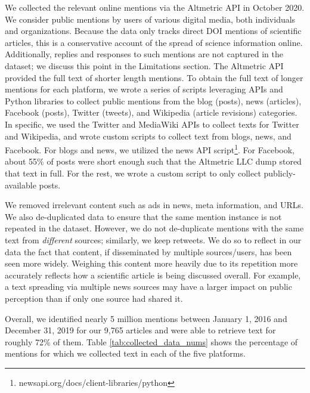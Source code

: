 \documentclass[letterpaper]{article} %
\begin{document}
We collected the relevant online mentions via the Altmetric API in October 2020. We consider public mentions by users of various digital media, both individuals and organizations. Because the data only tracks direct DOI mentions of scientific articles, this is a conservative account of the spread of science information online. Additionally, replies and responses to such mentions are not captured in the dataset; we discuss this point in the Limitations section.
The Altmetric API provided the full text of shorter length mentions. To obtain the full text of longer mentions for each platform, we wrote a series of scripts leveraging APIs and Python libraries to collect public mentions from the blog (posts), news (articles), Facebook (posts), Twitter (tweets), and Wikipedia (article revisions) categories. %
In specific, we used the Twitter and MediaWiki APIs to collect texts for Twitter and Wikipedia, and wrote custom scripts to collect text from blogs, news, and Facebook. For blogs and news, we utilized the news API script\footnote{newsapi.org/docs/client-libraries/python}. For Facebook, about 55\% of posts were short enough such that the Altmetric LLC dump stored that text in full. For the rest, we wrote a custom script to only collect publicly-available posts.

We removed irrelevant content such as ads in news, meta information, and URLs. We also de-duplicated data to ensure that the same mention instance is not repeated in the dataset. However, we do not de-duplicate mentions with the same text from \textit{different} sources; similarly, we keep retweets. We do so to reflect in our data the fact that content, if disseminated by multiple sources/users, has been seen more widely. Weighing this content more heavily due to its repetition more accurately reflects how a scientific article is being discussed overall. For example, a text spreading via multiple news sources may have a larger impact on public perception than if only one source had shared it.

Overall, we identified nearly 5 million mentions between January 1, 2016 and December 31, 2019 for our 9,765 articles and were able to retrieve text for roughly 72\% of them. Table \ref{tab:collected_data_nums} shows the percentage of mentions for which we collected text in each of the five platforms.
\end{document}

